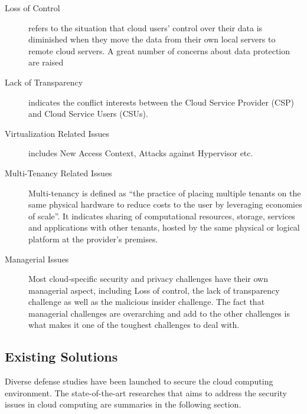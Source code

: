\documentclass[a4paper]{article}
\begin{document}
\begin{description}
	\item [Loss of Control] refers to the situation that cloud users’ control over their data is diminished when they move the data from their own local servers to remote cloud servers. A great number of concerns about
	data protection are raised
	\item [Lack of Transparency] indicates the conflict interests between the Cloud Service Provider (CSP) and Cloud Service Users (CSUs).
	\item [Virtualization Related Issues] includes New Access Context, Attacks against Hypervisor etc.
	\item[Multi-Tenancy Related Issues] Multi-tenancy is defined as “the practice of placing multiple tenants on the same physical hardware to reduce costs to the user by leveraging economies of scale”\cite{brown2012multi}. It indicates sharing of computational resources, storage, services and applications with other tenants, hosted by the same physical or logical platform at the provider’s premises.
	\item [Managerial Issues] Most cloud-specific security and privacy challenges have their own managerial aspect, including Loss of control, the lack of transparency challenge as well as the malicious insider challenge. The fact that managerial challenges are overarching
	and add to the other challenges is what makes it one of the toughest challenges to deal with.
\end{description}

\subsection{Existing Solutions}
Diverse defense studies have been launched to secure the cloud computing environment. The state-of-the-art researches that aims to
address the security issues in cloud computing are summaries in the following section.
\end{document}
